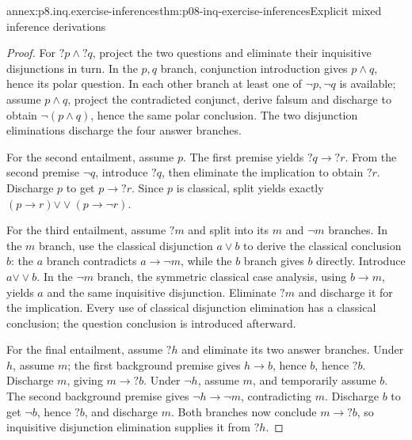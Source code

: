 \begin{annexitem}{annex:p8.inq.exercise-inferences}{thm:p08-inq-exercise-inferences}{Explicit mixed inference derivations}
\begin{proof}
For \(?p\land?q\), project the two questions and eliminate their
inquisitive disjunctions in turn. In the \(p,q\) branch, conjunction
introduction gives \(p\land q\), hence its polar question. In each
other branch at least one of \(\neg p,\neg q\) is available; assume
\(p\land q\), project the contradicted conjunct, derive falsum and
discharge to obtain \(\neg(p\land q)\), hence the same polar
conclusion. The two disjunction eliminations discharge the four
answer branches.

For the second entailment, assume \(p\). The first premise yields
\(?q\to?r\). From the second premise \(\neg q\), introduce
\(?q\), then eliminate the implication to obtain \(?r\).
Discharge \(p\) to get \(p\to?r\). Since \(p\) is classical,
split yields exactly \((p\to r)\mathbin{\vee\!\vee}(p\to\neg r)\).

For the third entailment, assume \(?m\) and split into its \(m\)
and \(\neg m\) branches. In the \(m\) branch, use the classical
disjunction \(a\lor b\) to derive the classical conclusion \(b\):
the \(a\) branch contradicts \(a\to\neg m\), while the \(b\)
branch gives \(b\) directly. Introduce \(a\mathbin{\vee\!\vee}b\).
In the \(\neg m\) branch, the symmetric classical case analysis,
using \(b\to m\), yields \(a\) and the same inquisitive
disjunction. Eliminate \(?m\) and discharge it for the implication.
Every use of classical disjunction elimination has a classical
conclusion; the question conclusion is introduced afterward.

For the final entailment, assume \(?h\) and eliminate its two
answer branches. Under \(h\), assume \(m\); the first background
premise gives \(h\to b\), hence \(b\), hence \(?b\).
Discharge \(m\), giving \(m\to?b\). Under \(\neg h\),
assume \(m\), and temporarily assume \(b\). The second background
premise gives \(\neg h\to\neg m\), contradicting \(m\).
Discharge \(b\) to get \(\neg b\), hence \(?b\), and
discharge \(m\). Both branches now conclude \(m\to?b\),
so inquisitive disjunction elimination supplies it from \(?h\).
\end{proof}
\end{annexitem}

